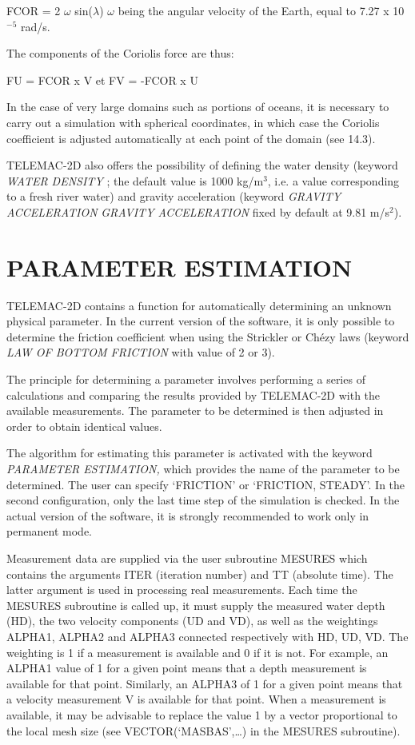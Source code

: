  FCOR = 2 $\omega$ sin($\lambda$)          $\omega$ being the angular velocity of the Earth, equal to 7.27 x 10${}^{-5}$ rad/s.

 The components of the Coriolis force are thus:

 FU = FCOR x V         et         FV = -FCOR x U

 In the case of very large domains such as portions of oceans, it is necessary to carry out a simulation with spherical coordinates, in which case the Coriolis coefficient is adjusted automatically at each point of the domain (see 14.3).

 TELEMAC-2D also offers the possibility of defining the water density (keyword \textit{WATER DENSITY} ; the default value is 1000 kg/m${}^{3}$, i.e. a value corresponding to a fresh river water) and gravity acceleration (keyword \textit{GRAVITY} \textit{ACCELERATION} \textit{GRAVITY ACCELERATION} fixed by default at 9.81 m/s${}^{2}$).


\section{ PARAMETER ESTIMATION}

 TELEMAC-2D contains a function for automatically determining an unknown physical parameter. In the current version of the software, it is only possible to determine the friction coefficient when using the Strickler or Ch\'{e}zy laws (keyword \textit{LAW OF BOTTOM FRICTION} with value of 2 or 3).

 The principle for determining a parameter involves performing a series of calculations and comparing the results provided by TELEMAC-2D with the available measurements. The parameter to be determined is then adjusted in order to obtain identical values.

 The algorithm for estimating this parameter is activated with the keyword \textit{PARAMETER ESTIMATION,} which provides the name of the parameter to be determined. The user can specify `FRICTION' or `FRICTION, STEADY'. In the second configuration, only the last time step of the simulation is checked. In the actual version of the software, it is strongly recommended to work only in permanent mode.

 Measurement data are supplied via the user subroutine MESURES which contains the arguments ITER (iteration number) and TT (absolute time). The latter argument is used in processing real measurements. Each time the MESURES subroutine is called up, it must supply the measured water depth (HD), the two velocity components (UD and VD), as well as the weightings ALPHA1, ALPHA2 and ALPHA3 connected respectively with HD, UD, VD. The weighting is 1 if a measurement is available and 0 if it is not. For example, an ALPHA1 value of 1 for a given point means that a depth measurement is available for that point. Similarly, an ALPHA3 of 1 for a given point means that a velocity measurement V is available for that point. When a measurement is available, it may be advisable to replace the value 1 by a vector proportional to the local mesh size (see VECTOR(`MASBAS',{\dots}) in the MESURES subroutine).

